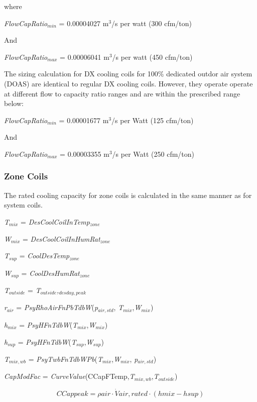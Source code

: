 where

\emph{FlowCapRatio\(_{min}\)} = 0.00004027 m\(^{3}\)/s per watt (300 cfm/ton)

And

\emph{FlowCapRatio\(_{max}\)} = 0.00006041 m\(^{3}\)/s per watt (450 cfm/ton)

The sizing calculation for DX cooling coils for 100\% dedicated outdor air system (DOAS) are identical to regular DX cooling coils. However, they operate operate at different flow to capacity ratio ranges and are within the prescribed range below:

\emph{FlowCapRatio\(_{min}\)} = 0.00001677 m\(^{3}\)/s per Watt (125 cfm/ton)

And

\emph{FlowCapRatio\(_{max}\)} = 0.00003355 m\(^{3}\)/s per Watt (250 cfm/ton)

\subsubsection{Zone Coils}\label{zone-coils-5}

The rated cooling capacity for zone coils is calculated in the same manner as for system coils.

\emph{T\(_{mix}\)} = \emph{DesCoolCoilInTemp\(_{zone}\)}

\emph{W\(_{mix}\)} = \emph{DesCoolCoilInHumRat\(_{zone}\)}

\emph{T\(_{sup}\)} = \emph{CoolDesTemp\(_{zone}\)}

\emph{W\(_{sup}\)} = \emph{CoolDesHumRat\(_{zone}\)}

\emph{T\(_{outside}\)} = \emph{T\(_{outside}\),\(_{desday,peak}\)}

\emph{r\(_{air}\)} = \emph{PsyRhoAirFnPbTdbW}(\emph{p\(_{air,std}\)}, \emph{T\(_{mix}\)},\emph{W\(_{mix}\)})

\emph{h\(_{mix}\)} = \emph{PsyHFnTdbW}(\emph{T\(_{mix}\)},\emph{W\(_{mix}\)})

\emph{h\(_{sup}\)} = \emph{PsyHFnTdbW}(\emph{T\(_{sup}\)},\emph{W\(_{sup}\)})

\emph{T\(_{mix,wb}\)} = \emph{PsyTwbFnTdbWPb}(\emph{T\(_{mix}\)},\emph{W\(_{mix}\)}, \emph{p\(_{air,std}\)})

\emph{CapModFac} = \emph{CurveValue}(CCapFTemp,\emph{T\(_{mix,wb}\)},\emph{T\(_{outside}\)})

\begin{equation}
CCappeak = \rho air\cdot \dot Vair,rated\cdot (hmix - hsup)
\end{equation}

